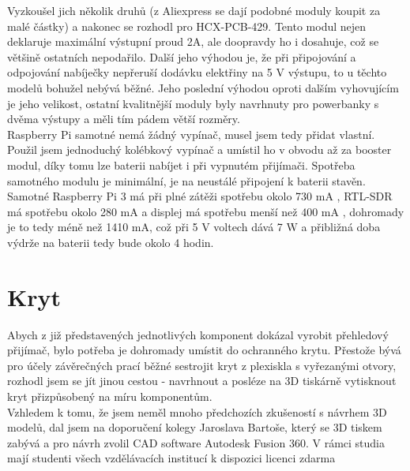 \documentclass{ctuthesis}
\begin{document}
 Vyzkoušel jich několik druhů (z Aliexpress se dají podobné moduly koupit za malé částky) a nakonec se rozhodl pro HCX-PCB-429. Tento modul nejen deklaruje maximální výstupní proud 2A, ale doopravdy ho i dosahuje, což se většině ostatních nepodařilo. Další jeho výhodou je, že při připojování a odpojování nabíječky nepřeruší dodávku elektřiny na 5 V výstupu, to u těchto modelů bohužel nebývá běžné. Jeho poslední výhodou oproti dalším vyhovujícím je jeho velikost, ostatní kvalitnější moduly byly navrhnuty pro powerbanky s dvěma výstupy a měli tím pádem větší rozměry. \\
 Raspberry Pi samotné nemá žádný vypínač, musel jsem tedy přidat vlastní. Použil jsem jednoduchý kolébkový vypínač a umístil ho v obvodu až za booster modul, díky tomu lze baterii nabíjet i při vypnutém přijímači. Spotřeba samotného modulu je minimální, je na neustálé připojení k baterii stavěn.\\
 Samotné Raspberry Pi 3 má při plné zátěži spotřebu okolo 730 mA \cite{powerpi}, RTL-SDR má spotřebu okolo 280 mA \cite{rtlsdrcom}a displej má spotřebu menší než 400 mA \cite{powerLCD}, dohromady je to tedy méně než 1410 mA, což při 5 V voltech dává 7 W a přibližná doba výdrže na baterii tedy bude okolo 4 hodin.
 
\section{Kryt}
Abych z již představených jednotlivých komponent dokázal vyrobit přehledový přijímač, bylo potřeba je dohromady umístit do ochranného krytu. Přestože bývá pro účely závěrečných prací běžné sestrojit kryt z plexiskla s vyřezanými otvory, rozhodl jsem se jít jinou cestou - navrhnout a posléze na 3D tiskárně vytisknout kryt přizpůsobený na míru komponentům. \\
Vzhledem k tomu, že jsem neměl mnoho předchozích zkušeností s návrhem 3D modelů, dal jsem na doporučení kolegy Jaroslava Bartoše, který se 3D tiskem zabývá a pro návrh zvolil CAD software Autodesk Fusion 360. V rámci studia mají studenti všech vzdělávacích institucí k dispozici licenci zdarma
\end{document}
